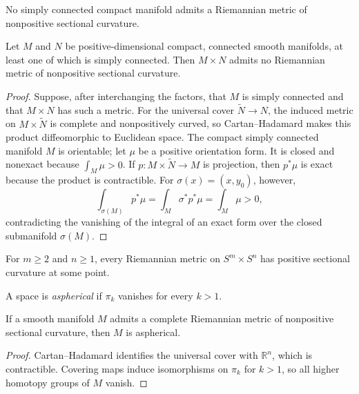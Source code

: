 \begin{corollary}
\label{cor:no-simply-connected-compact-nonpositive}
No simply connected compact manifold admits a Riemannian metric of
nonpositive sectional curvature.
\end{corollary}

\begin{corollary}
\label{cor:product-manifolds-nonpositive}
Let $M$ and $N$ be positive-dimensional compact, connected smooth manifolds,
at least one of which is simply connected.  Then $M\times N$ admits no
Riemannian metric of nonpositive sectional curvature.
\begin{proof}
\sketch Suppose, after interchanging the factors, that $M$ is simply connected
and that $M\times N$ has such a metric.  For the universal cover
$\widetilde N\to N$, the induced metric on $M\times\widetilde N$ is complete
and nonpositively curved, so Cartan--Hadamard makes this product diffeomorphic
to Euclidean space.  The compact simply connected manifold $M$ is orientable;
let $\mu$ be a positive orientation form.  It is closed and nonexact because
$\int_M\mu>0$.  If $p:M\times\widetilde N\to M$ is projection, then $p^*\mu$
is exact because the product is contractible.  For
$\sigma(x)=(x,y_0)$, however,
\[
\int_{\sigma(M)}p^*\mu=\int_M\sigma^*p^*\mu=\int_M\mu>0,
\]
contradicting the vanishing of the integral of an exact form over the closed
submanifold $\sigma(M)$.
\end{proof}
\end{corollary}

\begin{example}
\label{ex:positive-curvature-on-product-spheres}
For $m\geq2$ and $n\geq1$, every Riemannian metric on $S^m\times S^n$ has
positive sectional curvature at some point.
\end{example}

A space is \emph{aspherical} if $\pi_k$ vanishes for every $k>1$.

\begin{corollary}
\label{cor:nonpositive-implies-aspherical}
If a smooth manifold $M$ admits a complete Riemannian metric of nonpositive
sectional curvature, then $M$ is aspherical.
\begin{proof}
\sketch Cartan--Hadamard identifies the universal cover with $\mathbb R^n$,
which is contractible.  Covering maps induce isomorphisms on $\pi_k$ for
$k>1$, so all higher homotopy groups of $M$ vanish.
\end{proof}
\end{corollary}

